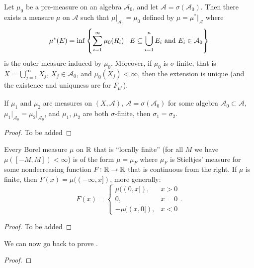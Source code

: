\documentclass[11pt,a4paper]{article}
\newcommand{\A}{\mathcal A}
\begin{document}
\begin{theorem}
  \label{thm:car-extension-theorem}
  Let $\mu_0$ be a pre-measure on an algebra $\A_0$,
  and let $\A = \sigma(\A_0)$.
  Then there exists a measure $\mu$ on $\A$ such that $\mu\vert_{\A_0} = \mu_0$
  defined by $\mu = \mu^*\vert_{\A}$ where
  \[
    \mu^*(E) = \inf \set{\sum_{i=1}^{\infty} \mu_0(R_i) \mid E \subseteq 
    \bigcup_{i=1}^{n} E_i \stand E_i \in \A_0}
  \]
  is the outer measure induced by $\mu_0$.
  Moreover, if $\mu_0$ is $\sigma$-finite, that is
  $X = \bigcup_{j=1}^{\infty} X_j$, $X_j \in \A_0$, and $\mu_0(X_j) < \infty$,
  then the extension is unique (and the existence and uniquness are
  for $F_{\mu^*}$).
\end{theorem}


\begin{corollary}
  If $\mu_1$ and $\mu_2$ are measures on $(X,\A)$, $\A = \sigma(\A_0)$ for
  some algebra $\A_0 \subset \A$,
  $\mu_1\vert_{\A_0} = \mu_2\vert_{\A_0}$, and $\mu_1$, $\mu_2$ are both
  $\sigma$-finite, then $\sigma_1 = \sigma_2$.
\end{corollary}
\begin{proof}
  To be added
\end{proof}

\begin{corollary}
  Every Borel measure $\mu$ on $\mathbb{R}$ that is ``locally finite''
  (for all $M$ we have $\mu([-M,M]) < \infty$) is of the form $\mu = \mu_F$
  where $\mu_F$ is Stieltjes' measure for some nondecreasing function
  $F \colon \mathbb{R} \to \mathbb{R}$ that is continuous from the right.
  If $\mu$ is finite, then $F(x) = \mu((-\infty,x])$,
  more generally:
  \[
    F(x) =
    \begin{cases}
      \mu((0,x]), &x > 0 \\
      0, &x = 0 \\
      -\mu((x,0]), &x < 0
    \end{cases}.
  \]
\end{corollary}
\begin{proof}
  To be added
\end{proof}

\begin{example}
\end{example}

We can now go back to prove .
\begin{proof}
\end{proof}
\end{document}
